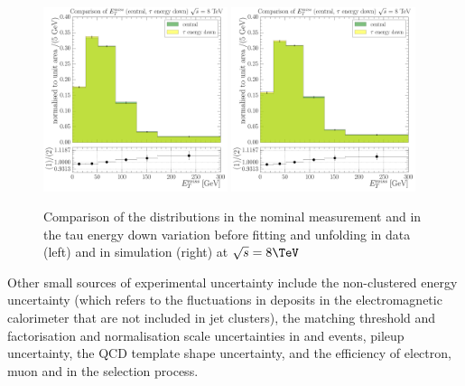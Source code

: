 \begin{figure}[hbtp]
    \centering
     \includegraphics[width=0.48\textwidth]{Chapters/04_Analysis/04b_XSections/images/tau_cross_checks/compare_central_MET_to_tau_energy_down_asym_bins_electron_channel_data.pdf}\hfill
     \includegraphics[width=0.48\textwidth]{Chapters/04_Analysis/04b_XSections/images/tau_cross_checks/compare_central_MET_to_tau_energy_down_asym_bins_electron_channel_TTJet.pdf}
     \caption{Comparison of the \met distributions in the nominal measurement and in the tau energy down
     variation before fitting and unfolding in data (left) and in \ttbar simulation (right) at
     $\sqrt{s}=8\TeV$}
     \label{fig:tau_down_comparison}
\end{figure}
 


Other small sources of experimental uncertainty include the non-clustered energy uncertainty (which refers to
the fluctuations in deposits in the electromagnetic calorimeter that are not included in jet clusters), the
matching threshold and factorisation and normalisation scale uncertainties in \WpJets and \ZpJets events,
pileup uncertainty, the QCD template shape uncertainty, and the efficiency of electron, muon and \btagging in
the selection process.

